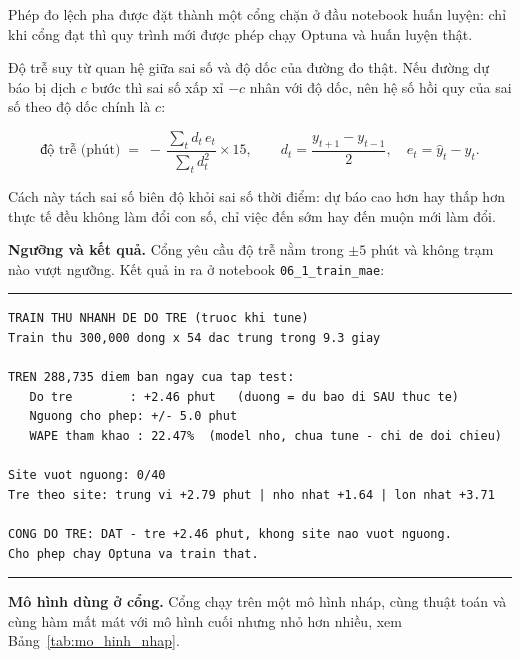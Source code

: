 \documentclass[12pt, a4paper]{report}
\begin{document}
Phép đo lệch pha được đặt thành một cổng chặn ở đầu notebook huấn luyện: chỉ khi cổng đạt
thì quy trình mới được phép chạy Optuna và huấn luyện thật.

Độ trễ suy từ quan hệ giữa sai số và độ dốc của đường đo thật. Nếu đường dự báo bị dịch
$c$ bước thì sai số xấp xỉ $-c$ nhân với độ dốc, nên hệ số hồi quy của sai số theo độ dốc
chính là $c$:

\begin{equation}
\text{độ trễ (phút)} \;=\; -\,\frac{\sum_t d_t \, e_t}{\sum_t d_t^{2}} \times 15,
\qquad
d_t = \frac{y_{t+1} - y_{t-1}}{2}, \quad e_t = \hat{y}_t - y_t .
\end{equation}

Cách này tách sai số biên độ khỏi sai số thời điểm: dự báo cao hơn hay thấp hơn thực tế
đều không làm đổi con số, chỉ việc đến sớm hay đến muộn mới làm đổi.

\textbf{Ngưỡng và kết quả.} Cổng yêu cầu độ trễ nằm trong $\pm 5$ phút và không trạm nào vượt
ngưỡng. Kết quả in ra ở notebook \texttt{06\_1\_train\_mae}:

\begingroup
\par\vspace{6pt}\hrule\vspace{4pt}
\small\renewcommand{\baselinestretch}{1.0}\selectfont
\begin{verbatim}
TRAIN THU NHANH DE DO TRE (truoc khi tune)
Train thu 300,000 dong x 54 dac trung trong 9.3 giay

TREN 288,735 diem ban ngay cua tap test:
   Do tre        : +2.46 phut   (duong = du bao di SAU thuc te)
   Nguong cho phep: +/- 5.0 phut
   WAPE tham khao : 22.47%  (model nho, chua tune - chi de doi chieu)

Site vuot nguong: 0/40
Tre theo site: trung vi +2.79 phut | nho nhat +1.64 | lon nhat +3.71

CONG DO TRE: DAT - tre +2.46 phut, khong site nao vuot nguong.
Cho phep chay Optuna va train that.
\end{verbatim}
\vspace{2pt}\hrule\par\vspace{6pt}
\endgroup

\textbf{Mô hình dùng ở cổng.} Cổng chạy trên một mô hình nháp, cùng thuật toán và cùng hàm
mất mát với mô hình cuối nhưng nhỏ hơn nhiều, xem Bảng~\ref{tab:mo_hinh_nhap}.
\end{document}
